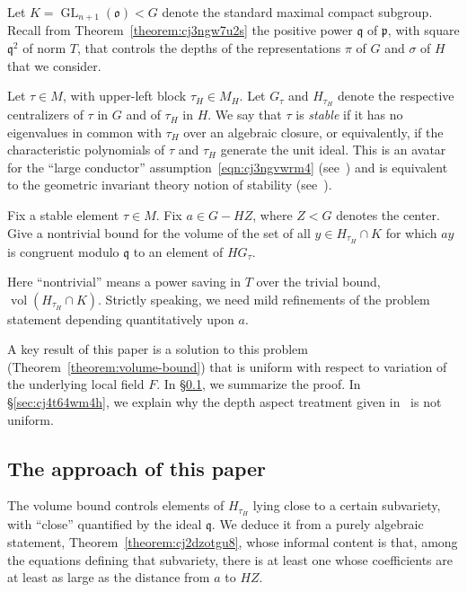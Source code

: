 \documentclass[reqno]{amsart}
\DeclareMathOperator{\GL}{GL}
\DeclareMathOperator{\vol}{vol}
\theoremstyle{plain} \newtheorem{theorem} {Theorem} \newtheorem{conjecture} {Conjecture} \newtheorem{corollary} [theorem] {Corollary} \newtheorem{proposition} [theorem] {Proposition} \newtheorem{fact} [theorem] {Fact}
\theoremstyle{definition} \newtheorem{definition} [theorem] {Definition}
\theoremstyle{itplain} %
\begin{document}
Let $K = \GL_{n+1}(\mathfrak{o}) < G$ denote the standard maximal compact subgroup.  Recall from Theorem~\ref{theorem:cj3ngw7u2s} the positive power $\mathfrak{q}$ of $\mathfrak{p}$, with square $\mathfrak{q}^2$ of norm $T$, that controls the depths of the representations $\pi$ of $G$ and $\sigma$ of $H$ that we consider.

Let $\tau \in M$, with upper-left block $\tau_H \in M_H$.  Let $G_\tau$ and $H_{\tau_H}$ denote the respective centralizers of $\tau$ in $G$ and of $\tau_H$ in $H$.  We say that $\tau$ is \emph{stable} if it has no eigenvalues in common with $\tau_H$ over an algebraic closure, or equivalently, if the characteristic polynomials of $\tau$ and $\tau_H$ generate the unit ideal.  This is an avatar for the ``large conductor'' assumption~\eqref{eqn:cj3ngvwrm4} (see~\cite[\S15]{nelson-venkatesh-1}) and is equivalent to the geometric invariant theory notion of stability (see~\cite[\S14]{nelson-venkatesh-1}).

\begin{problem}\label{Probleminformal}
  Fix a stable element $\tau \in M$.  Fix $a \in G - H Z$, where $Z < G$ denotes the center.  Give a nontrivial bound for the volume of the set of all $y \in H_{\tau_H} \cap K$ for which $a y$ is congruent modulo $\mathfrak{q}$ to an element of $H G_\tau$.
\end{problem}
Here ``nontrivial'' means a power saving in $T$ over the trivial bound, $\vol(H_{\tau_H} \cap K)$.  Strictly speaking, we need mild refinements of the problem statement depending quantitatively upon $a$.

A key result of this paper is a solution to this problem (Theorem~\ref{theorem:volume-bound}) that is uniform with respect to variation of the underlying local field $F$.  In \S\ref{sec:cj4t647ljn}, we summarize the proof.  In \S\ref{sec:cj4t64wm4h}, we explain why the depth aspect treatment given in~\cite{2020arXiv201202187N} is not uniform.

\subsection{The approach of this paper}\label{sec:cj4t647ljn}
The volume bound controls elements of $H_{\tau_H}$ lying close to a certain subvariety, with ``close'' quantified by the ideal $\mathfrak{q}$.  We deduce it from a purely algebraic statement, Theorem~\ref{theorem:cj2dzotgu8}, whose informal content is that, among the equations defining that subvariety, there is at least one whose coefficients are at least as large as the distance from $a$ to $H Z$.
\end{document}
